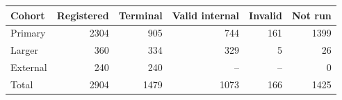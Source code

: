 \begin{tabular}{@{}lrrrrr@{}}\toprule
Cohort & Registered & Terminal & Valid internal & Invalid & Not run\\\midrule
Primary & 2304 & 905 & 744 & 161 & 1399\\
Larger & 360 & 334 & 329 & 5 & 26\\
External & 240 & 240 & -- & -- & 0\\
Total & 2904 & 1479 & 1073 & 166 & 1425\\
\bottomrule
\end{tabular}
